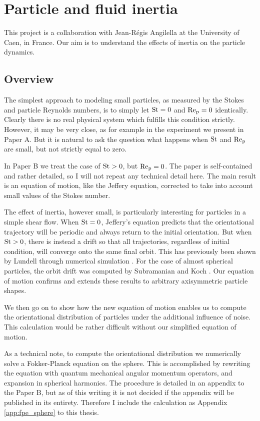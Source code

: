 \documentclass[thesis.tex]{subfiles}
\begin{document}
\chapter{Particle and fluid inertia}

This project is a collaboration with Jean-R\'egis Angilella at the University of Caen, in France. Our aim is to understand the effects of inertia on the particle dynamics.

\section{Overview}

The simplest approach to modeling small particles, as measured by the Stokes and particle Reynolds numbers, is to simply let $\mbox{St}=0$ and $\mbox{Re}_{\mathrm p}=0$ identically. Clearly there is no real physical system which fulfills this condition strictly. However, it may be very close, as for example in the experiment we present in Paper A. But it is natural to ask the question what happens when $\mbox{St}$ and $\mbox{Re}_{\mathrm p}$ are small, but not strictly equal to zero.

In Paper B we treat the case of $\mbox{St}>0$, but $\mbox{Re}_{\mathrm p}=0$. The paper is self-contained and rather detailed, so I will not repeat any technical detail here. The main result is an equation of motion, like the Jeffery equation, corrected to take into account small values of the Stokes number.

The effect of inertia, however small, is particularly interesting for particles in a simple shear flow. When $\mbox{St}=0$, Jeffery's equation predicts that the orientational trajectory will be periodic and always return to the initial orientation. But when $\mbox{St}>0$, there is instead a drift so that all trajectories, regardless of initial condition, will converge onto the same final orbit. This has previously been shown by Lundell through numerical simulation \cite{lundell2010}. For the case of almost spherical particles, the orbit drift was computed by Subramanian and Koch \cite{sub06}. Our equation of motion confirms and extends these results to arbitrary axisymmetric particle shapes.

We then go on to show how the new equation of motion enables us to compute the orientational distribution of particles under the additional influence of noise. This calculation would be rather difficult without our simplified equation of motion.

As a technical note, to compute the orientational distribution we numerically solve a Fokker-Planck equation on the sphere. This is accomplished by rewriting the equation with quantum mechanical angular momentum operators, and expansion in spherical harmonics. The procedure is detailed in an appendix to the Paper B, but as of this writing it is not decided if the appendix will be published in its entirety. Therefore I include the calculation as Appendix \ref{app:fpe_sphere} to this thesis.
\end{document}
